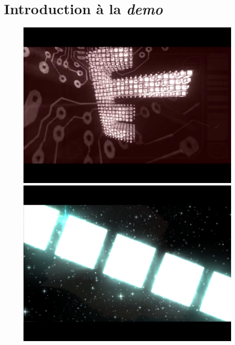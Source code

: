 \section{Introduction à la \textit{demo}}
\begin{figure}[h]
  \begin{minipage}[b]{0.30\linewidth}
    \centering
    \includegraphics[width=\linewidth]{images/demoscene/demos/kewl1.png}
  \end{minipage}
  \hfill
  \begin{minipage}[b]{0.30\linewidth}
    \centering
    \includegraphics[width=\linewidth]{images/demoscene/demos/kewl2.png}
  \end{minipage}
  \hfill
  \begin{minipage}[b]{0.30\linewidth}

\end{minipage}
\end{figure}
